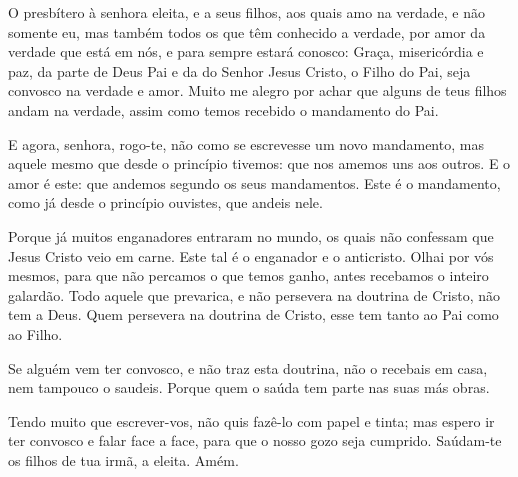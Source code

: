 
O presbítero à senhora eleita, e a seus filhos, aos quais amo na
verdade, e não somente eu, mas também todos os que têm conhecido a
verdade, por amor da verdade que está em nós, e para sempre
estará conosco: Graça, misericórdia e paz, da parte de Deus Pai
e da do Senhor Jesus Cristo, o Filho do Pai, seja convosco na
verdade e amor. Muito me alegro por achar que alguns de teus
filhos andam na verdade, assim como temos recebido o mandamento do
Pai.

E agora, senhora, rogo-te, não como se escrevesse um novo
mandamento, mas aquele mesmo que desde o princípio tivemos: que nos
amemos uns aos outros. E o amor é este: que andemos segundo os
seus mandamentos. Este é o mandamento, como já desde o princípio
ouvistes, que andeis nele.

Porque já muitos enganadores entraram no mundo, os quais não
confessam que Jesus Cristo veio em carne. Este tal é o enganador e o
anticristo. Olhai por vós mesmos, para que não percamos o que
temos ganho, antes recebamos o inteiro galardão. Todo aquele que
prevarica, e não persevera na doutrina de Cristo, não tem a Deus.
Quem persevera na doutrina de Cristo, esse tem tanto ao Pai como ao
Filho.

Se alguém vem ter convosco, e não traz esta doutrina, não o
recebais em casa, nem tampouco o saudeis. Porque quem o saúda
tem parte nas suas más obras.

Tendo muito que escrever-vos, não quis fazê-lo com papel e tinta;
mas espero ir ter convosco e falar face a face, para que o nosso
gozo seja cumprido. Saúdam-te os filhos de tua irmã, a
eleita. Amém.

